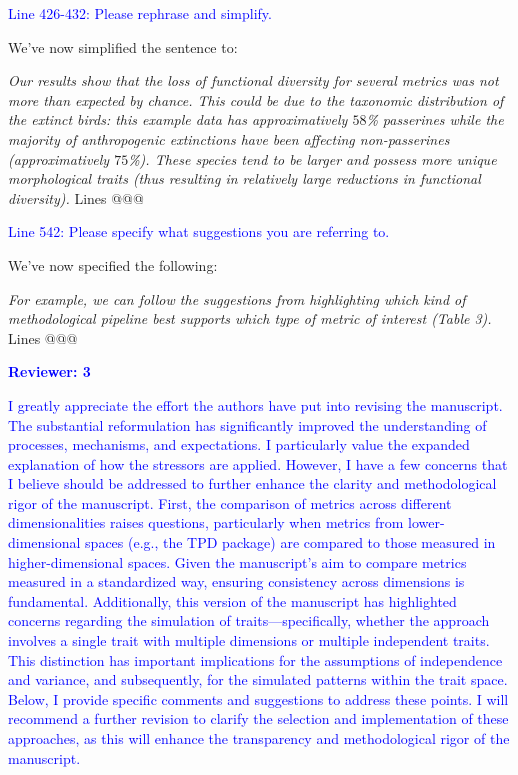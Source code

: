 \documentclass[
]{article}
\begin{document}
\textcolor{blue}{Line 426-432: Please rephrase and simplify.}

We've now simplified the sentence to:

\textit{Our results show that the loss of  functional diversity for several metrics was not more than expected by chance.
This could be due to the taxonomic distribution of the extinct birds: this example data has approximatively $58$\% passerines while the majority of anthropogenic extinctions have been affecting non-passerines (approximatively $75$\%).
These species tend to be larger and possess more unique morphological traits (thus resulting in relatively large reductions in functional diversity).} Lines @@@

\textcolor{blue}{Line 542: Please specify what suggestions you are referring to.}

We've now specified the following:

\textit{For example, we can follow the suggestions from \cite{mammola2021concepts} highlighting which kind of methodological pipeline best supports which type of metric of interest (Table 3).} Lines @@@

\textcolor{blue}{\textbf{Reviewer: 3}}

\textcolor{blue}{I greatly appreciate the effort the authors have put into revising the manuscript.
The substantial reformulation has significantly improved the understanding of processes, mechanisms, and expectations.
I particularly value the expanded explanation of how the stressors are applied.
However, I have a few concerns that I believe should be addressed to further enhance the clarity and methodological rigor of the manuscript.
First, the comparison of metrics across different dimensionalities raises questions, particularly when metrics from lower-dimensional spaces (e.g., the TPD package) are compared to those measured in higher-dimensional spaces.
Given the manuscript's aim to compare metrics measured in a standardized way, ensuring consistency across dimensions is fundamental.
Additionally, this version of the manuscript has highlighted concerns regarding the simulation of traits—specifically, whether the approach involves a single trait with multiple dimensions or multiple independent traits.
This distinction has important implications for the assumptions of independence and variance, and subsequently, for the simulated patterns within the trait space.
Below, I provide specific comments and suggestions to address these points.
I will recommend a further revision to clarify the selection and implementation of these approaches, as this will enhance the transparency and methodological rigor of the manuscript.}
\end{document}
